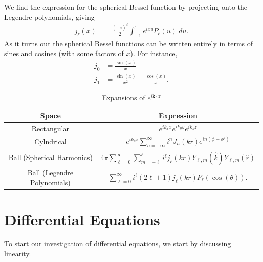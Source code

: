 \documentclass[10pt]{mypackage}
\begin{document}
  We find the expression for the spherical Bessel function by projecting onto the Legendre polynomials, giving
  \begin{align*}
    j_{\ell}\left( x \right) &= \frac{\left( -i \right)^{\ell}}{2} \int_{-1}^{1} e^{ixu}P_{\ell}\left( u \right)\:du.
  \end{align*}
  As it turns out the spherical Bessel functions can be written entirely in terms of sines and cosines (with some factors of $x$). For instance,
  \begin{align*}
    j_0 &= \frac{\sin\left( x \right)}{x}\\
    j_1 &= \frac{\sin\left( x \right)}{x^2} - \frac{\cos\left( x \right)}{x}.
  \end{align*}
  \begin{table}[h!]
    \centering
    \renewcommand{\arraystretch}{2.5}
    \begin{tabular}{c|c}
      Space & Expression\\
      \hline
      \hline
      Rectangular & $\displaystyle e^{ik_x x}e^{ik_y y}e^{ik_z z}$\\
      Cylndrical & $\displaystyle e^{ik_z z}\sum_{n=-\infty}^{\infty} i^n J_n\left( kr \right)e^{in\left( \phi-\phi' \right)}$\\
      Ball (Spherical Harmonics) & $\displaystyle 4\pi\sum_{\ell=0}^{\infty}\sum_{m=-\ell}^{\ell}i^{\ell}j_{\ell}\left( kr \right) \overline{Y_{\ell,m}\left( \hat{k} \right)}Y_{\ell,m}\left( \hat{r} \right)$\\
      Ball (Legendre Polynomials) & $\displaystyle \sum_{\ell=0}^{\infty}i^{\ell}\left( 2\ell + 1 \right)j_{\ell}\left( kr \right)P_{\ell}\left( \cos\left( \theta \right) \right)$.
    \end{tabular}
    \caption{Expansions of $e^{i\mathbf{k}\cdot \mathbf{r}}$}
  \end{table}
  \section{Differential Equations}%
  To start our investigation of differential equations, we start by discussing linearity.\newline
\end{document}
